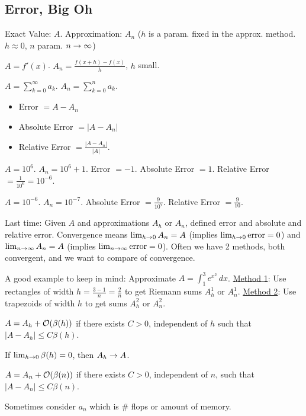\documentclass[]{article}
\begin{document}
\subsection*{Error, Big Oh}

Exact Value: $A$.
Approximation: $A_n$ ($h$ is a param. fixed in the approx. method. $h\approx 0$, $n$ param. $n\rightarrow\infty$)

\begin{example}
	$A = f'(x)$.
	$A_n = \frac{f(x+h)-f(x)}{h}$, $h$ small.
\end{example}
\begin{example}
	$A = \sum_{k=0}^\infty a_k$.
	$A_n = \sum_{k=0}^n a_k$.
\end{example}

\begin{itemize}
	\item Error $ = A-A_n$
	\item Absolute Error $= |A-A_n|$
	\item Relative Error $= \frac{|A-A_n|}{|A|}$.
\end{itemize}

\begin{example}
	$A = 10^6$. $A_n = 10^6+1$.
	Error $=-1$.
	Absolute Error $=1$.
	Relative Error $=\frac1{10^6} = 10^{-6}$.
\end{example}
\begin{example}
	$A = 10^{-6}$. $A_n = 10^{-7}$.
	Absolute Error $=\frac9{10^7}$.
	Relative Error $=\frac9{10}$.
\end{example}

\newpage

Last time:
Given $A$ and approximations $A_h$ or $A_n$, defined error and absolute and relative error.
Convergence means $\lim_{h\rightarrow0} A_n=A$ (implies $\lim_{h\rightarrow0}\text{error}=0$) and $\lim_{n\rightarrow\infty} A_n = A$ (implies $\lim_{n\rightarrow\infty}\text{error}=0$).
Often we have 2 methods, both convergent, and we want to compare  of convergence.

A good example to keep in mind: 
Approximate $A = \int_1^3 e^{x^2}\,dx$.
\ul{Method 1}: Use rectangles of width $h = \frac{3-1}{n} = \frac2n$ to get Riemann sums $A_h^1$ or $A_n^1$.
\ul{Method 2}: Use trapezoids of width $h$ to get sums $A_h^2$ or $A_n^2$.

\begin{definition}
	$A = A_h + \mathcal{O}(\beta(h))$ if there exists $C>0$, independent of $h$ such that $|A-A_h|\leq C\beta(h)$.
\end{definition}
\begin{note}
	If $\lim_{h\rightarrow0}\beta(h)=0$, then $A_h\rightarrow A$.
\end{note}
\begin{definition}
	$A = A_n + \mathcal{O}(\beta(n))$ if there exists $C>0$, independent of $n$, such that $|A-A_n|\leq C\beta(n)$.
\end{definition}
Sometimes consider $a_n$ which is \# flops or amount of memory.
\end{document}
